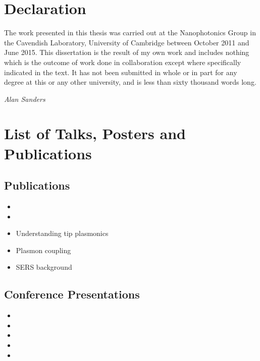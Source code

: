 \documentclass[12pt, a4paper, oneside]{book}
\begin{document}
\begin{singlespace}

\section*{Declaration}
The work presented in this thesis was carried out at the Nanophotonics Group in the Cavendish Laboratory, University of Cambridge between October 2011 and June 2015. This dissertation is the result of my own work and includes nothing which is the outcome of work done in collaboration except where specifically indicated in the text. It has not been submitted in whole or in part for any degree at this or any other university, and is less than sixty thousand words long.

{\flushright\emph{Alan Sanders}\par}

\section*{List of Talks, Posters and Publications}
\subsection*{Publications}
\begin{itemize}
\item {}
\item {}
\item Understanding tip plasmonics
\item Plasmon coupling
\item SERS background
\end{itemize}

\subsection*{Conference Presentations}
\begin{itemize}
\item {}
\item {}
\item {}
\item {}
\item {}
\end{itemize}


\end{singlespace}
\end{document}
